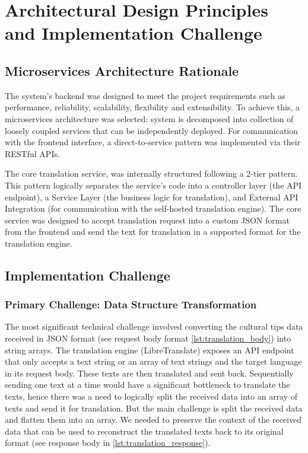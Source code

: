 \section{Architectural Design Principles and Implementation Challenge}

\subsection{Microservices Architecture Rationale}

The system's backend was designed to meet the project requirements such as performance, reliability, scalability, flexibility and extensibility. To achieve this, a microservices architecture was selected: system is decomposed into collection of loosely coupled services that can be independently deployed\cite{newman2021building}. For communication with the frontend interface, a direct-to-service pattern was implemented via their RESTful APIs.

The core translation service, was internally structured following a 2-tier pattern\cite{fowler2002patterns}. This pattern logically separates the service's code into a controller layer (the API endpoint), a Service Layer (the business logic for translation), and External API Integration (for communication with the self-hosted translation engine). The core service was designed to accept translation request into a custom JSON format from the frontend and send the text for translation in a supported format for the translation engine.

\subsection{Implementation Challenge}

\subsubsection{Primary Challenge: Data Structure Transformation}

The most significant technical challenge involved converting the cultural tips data received in JSON format (see request body format \autoref{lst:translation_body}) into string arrays. The translation engine (LibreTranslate) exposes an API endpoint that only accepts a text string or an array of text strings and the target language in its request body\cite{libretranslate_api_translate}. These texts are then translated and sent back. Sequentially sending one text at a time would have a significant bottleneck to translate the texts, hence there was a need to logically split the received data into an array of texts and send it for translation. But the main challenge is split the received data and flatten them into an array. We needed to preserve the context of the received data that can be used to reconstruct the translated texts back to its original format (see response body in \autoref{lst:translation_response}).


